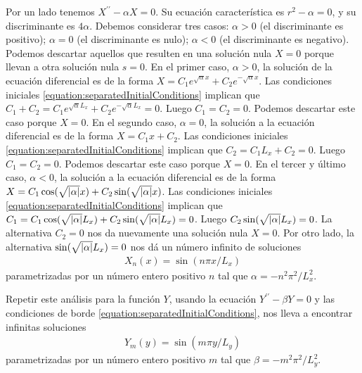 \documentclass{article}
\DeclarePairedDelimiter\abs{\lvert}{\rvert}
\begin{document}
  Por un lado tenemos \(X^{\prime\prime} - \alpha X = 0\).
  Su ecuación característica es \(r^2 - \alpha = 0\), y su discriminante es \(4 \alpha\).
  Debemos considerar tres casos: \(\alpha > 0\) (el discriminante es positivo); \(\alpha = 0\) (el discriminante es nulo); \(\alpha < 0\) (el discriminante es negativo).
  Podemos descartar aquellos que resulten en una solución nula \(X = 0\) porque llevan a otra solución nula \(s = 0\).
  En el primer caso, \(\alpha > 0\), la solución de la ecuación diferencial es de la forma \(X = C_1 e^{\sqrt{\alpha} x} + C_2 e^{- \sqrt{\alpha} x}\).
  Las condiciones iniciales \eqref{equation:separatedInitialConditions} implican que \(C_1 + C_2 = C_1 e^{\sqrt{\alpha} L_x} + C_2 e^{- \sqrt{\alpha} L_x} = 0\).
  Luego \(C_1 = C_2 = 0\).
  Podemos descartar este caso porque \(X = 0\).
  En el segundo caso, \(\alpha = 0\), la solución a la ecuación diferencial es de la forma \(X = C_1 x + C_2\).
  Las condiciones iniciales \eqref{equation:separatedInitialConditions} implican que \(C_2 = C_1 L_x + C_2 = 0\).
  Luego \(C_1 = C_2 = 0\).
  Podemos descartar este caso porque \(X = 0\).
  En el tercer y último caso, \(\alpha < 0\), la solución a la ecuación diferencial es de la forma \(X = C_1 \cos(\sqrt{\abs{\alpha}} x) + C_2 \sin(\sqrt{\abs{\alpha}} x)\).
  Las condiciones iniciales \eqref{equation:separatedInitialConditions} implican que \(C_1 = C_1 \cos(\sqrt{\abs{\alpha}} L_x) + C_2 \sin(\sqrt{\abs{\alpha}} L_x) = 0\).
  Luego \(C_2 \sin(\sqrt{\abs{\alpha}} L_x) = 0\).
  La alternativa \(C_2 = 0\) nos da nuevamente una solución nula \(X = 0\).
  Por otro lado, la alternativa \(\sin(\sqrt{\abs{\alpha}} L_x) = 0\) nos dá un número infinito de soluciones
  \begin{align}
    X_n(x) = \sin(n \pi x / L_x)
  \end{align}
  parametrizadas por un número entero positivo \(n\) tal que \(\alpha = - n^2 \pi^2 / L_x^2\).

  Repetir este análisis para la función \(Y\), usando la ecuación \(Y^{\prime\prime} - \beta Y = 0\) y las condiciones de borde \eqref{equation:separatedInitialConditions}, nos lleva a encontrar infinitas soluciones
  \begin{align}
    Y_m(y) = \sin(m \pi y / L_y)
  \end{align}
  parametrizadas por un número entero positivo \(m\) tal que \(\beta = - m^2 \pi^2 / L_y^2\).
\end{document}
